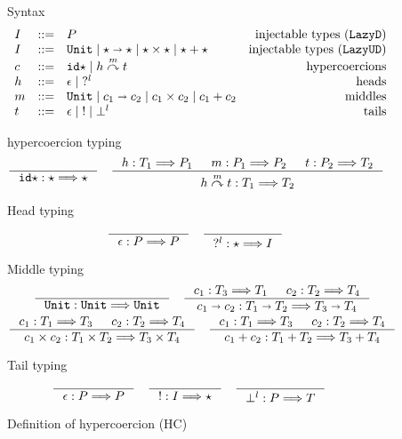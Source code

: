 \documentclass[acmsmall,review,anonymous]{acmart}\settopmatter{printfolios=true,printccs=false,printacmref=false}
\newcommand{\stxrule}[3]{#1 & ::= & #3 & \text{#2}\\}
\newcommand{\plus}[0]{+}
\newcommand{\lazyUD}{$\mathtt{Lazy UD}$}
\newcommand{\lazyD}{$\mathtt{Lazy D}$}
\newcommand{\TOOdyn}[0]{\star}
\newcommand{\POOunit}[0]{\mathtt{Unit}}
\newcommand{\POOfun}[2]{#1 \shortrightarrow #2}
\newcommand{\POOprod}[2]{#1 \times #2}
\newcommand{\POOsum}[2]{#1 \plus #2}
\newcommand{\typingHC}[3]{#1 : #2 \Longrightarrow #3}
\newcommand{\hyperCoercionI}[0]{\mathtt{id\star}}
\newcommand{\hyperCoercionC}[3]{#1 \overset{#2}{\curvearrowright} #3}
\begin{document}
\begin{figure}
	Syntax
	\[
	\begin{array}{lclr}
	\stxrule{I}{injectable types (\lazyD)}{P}
	\stxrule{I}{injectable types (\lazyUD)}{
		\POOunit \mid
		\POOfun{\TOOdyn}{\TOOdyn} \mid
		\POOprod{\TOOdyn}{\TOOdyn} \mid
		\POOsum{\TOOdyn}{\TOOdyn}
	}
	\stxrule{c}{hypercoercions}{
		\hyperCoercionI \mid{}
		\hyperCoercionC{h}{m}{t}
	}
	\stxrule{h}{heads}{
		\epsilon \mid{}
		?^l
	}
	\stxrule{m}{middles}{
		\POOunit \mid
		\POOfun{c_1}{c_2} \mid
		\POOprod{c_1}{c_2} \mid
		\POOsum{c_1}{c_2}
	}
	\stxrule{t}{tails}{
		\epsilon \mid{}
		! \mid{}
		\bot^l
	}
	\end{array}
	\]
		
	hypercoercion typing 
	\begin{gather*}
	\inference{}{\typingHC{\hyperCoercionI}{\TOOdyn}{\TOOdyn}}
	\quad
	\inference{
		\typingHC{h}{T_1}{P_1} &
		\typingHC{m}{P_1}{P_2} &
		\typingHC{t}{P_2}{T_2}
	}{
		\typingHC{\hyperCoercionC{h}{m}{t}}{T_1}{T_2}
	}
	\end{gather*}
	
	Head typing \fbox{$ \typingHC{h}{T}{P} $}
	\begin{gather*}
	\inference{}{\typingHC{\epsilon}{P}{P}}
	\quad
	\inference{}{\typingHC{?^l}{\TOOdyn}{I}}
	\end{gather*}
	
	Middle typing \fbox{$ \typingHC{m}{T}{T} $}
	\begin{gather*}
	\inference{}{\typingHC{\POOunit}{\POOunit}{\POOunit}}
	\quad
	\inference{
		\typingHC{c_1}{T_3}{T_1} &
		\typingHC{c_2}{T_2}{T_4}
	}{
		\typingHC{\POOfun{c_1}{c_2}}{\POOfun{T_1}{T_2}}{\POOfun{T_3}{T_4}}
	}
	\\
	\inference{
		\typingHC{c_1}{T_1}{T_3} &
		\typingHC{c_2}{T_2}{T_4}
	}{
		\typingHC{\POOprod{c_1}{c_2}}{\POOprod{T_1}{T_2}}{\POOprod{T_3}{T_4}}
	}
	\quad
	\inference{
		\typingHC{c_1}{T_1}{T_3} &
		\typingHC{c_2}{T_2}{T_4}
	}{
		\typingHC{\POOsum{c_1}{c_2}}{\POOsum{T_1}{T_2}}{\POOsum{T_3}{T_4}}
	}
		\end{gather*}
		
		Tail typing \fbox{$ \typingHC{t}{P}{T} $}
		\begin{gather*}
		\inference{}{\typingHC{\epsilon}{P}{P}} \quad
		\inference{}{\typingHC{!}{I}{\TOOdyn}} \quad
		\inference{}{\typingHC{\bot^l}{P}{T}} \quad
		\end{gather*}
	
	\caption{Definition of hypercoercion (HC)}
	\label{fig:hypercoercion}
\end{figure}
\end{document}
